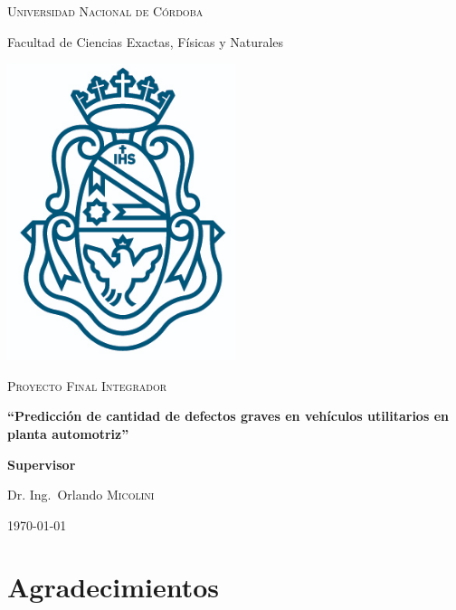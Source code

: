 \documentclass[a4paper,12pt]{article}
\author{Gerardo A. COLLANTE \\ Matrícula: 39.022.782 \\ Email: \href{mailto:gerardo.collante@unc.edu.ar}{gerardo.collante@unc.edu.ar} \\ Cel: 54 (03574) 650490}
\begin{document}
\makeatletter
\begin{titlepage}
		
	{\scshape\LARGE Universidad Nacional de Córdoba \par}
	{\Large Facultad de Ciencias Exactas, Físicas y Naturales \par}
	\vspace{0.5cm}
	\centering
	\includegraphics[width=0.5\textwidth]{unc.png}
	\par\vspace{0.5cm}
	\vspace{0.5cm}
	{\scshape\Large Proyecto Final Integrador\par}
	\vspace{1cm}
	{\large\bfseries ``Predicción de cantidad de defectos graves en vehículos utilitarios en planta automotriz'' \par}
	\vspace{1cm}
		
	\normalsize\@author\space
		
	\vspace{1cm}
	\textbf{Supervisor}\par
	Dr. Ing.~Orlando \textsc{Micolini}
	
	\vfill
	
	{\large \today\par}
\end{titlepage}

\newpage
\thispagestyle{empty}
\section*{Agradecimientos}
\vspace*{\fill}
\end{document}
